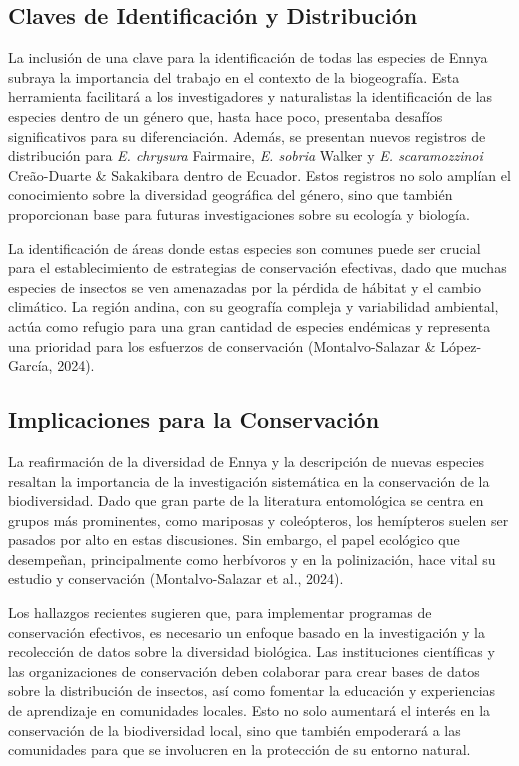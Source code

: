 \documentclass[
  letterpaper,
  DIV=11,
  numbers=noendperiod,
  oneside]{scrreprt}
\begin{document}
\subsection{Claves de Identificación y
Distribución}\label{claves-de-identificaciuxf3n-y-distribuciuxf3n}

La inclusión de una clave para la identificación de todas las especies
de Ennya subraya la importancia del trabajo en el contexto de la
biogeografía. Esta herramienta facilitará a los investigadores y
naturalistas la identificación de las especies dentro de un género que,
hasta hace poco, presentaba desafíos significativos para su
diferenciación. Además, se presentan nuevos registros de distribución
para \emph{E. chrysura} Fairmaire, \emph{E. sobria} Walker y \emph{E.
scaramozzinoi} Creão-Duarte \& Sakakibara dentro de Ecuador. Estos
registros no solo amplían el conocimiento sobre la diversidad geográfica
del género, sino que también proporcionan base para futuras
investigaciones sobre su ecología y biología.

La identificación de áreas donde estas especies son comunes puede ser
crucial para el establecimiento de estrategias de conservación
efectivas, dado que muchas especies de insectos se ven amenazadas por la
pérdida de hábitat y el cambio climático. La región andina, con su
geografía compleja y variabilidad ambiental, actúa como refugio para una
gran cantidad de especies endémicas y representa una prioridad para los
esfuerzos de conservación (Montalvo-Salazar \& López-García, 2024).

\subsection{Implicaciones para la
Conservación}\label{implicaciones-para-la-conservaciuxf3n-1}

La reafirmación de la diversidad de Ennya y la descripción de nuevas
especies resaltan la importancia de la investigación sistemática en la
conservación de la biodiversidad. Dado que gran parte de la literatura
entomológica se centra en grupos más prominentes, como mariposas y
coleópteros, los hemípteros suelen ser pasados por alto en estas
discusiones. Sin embargo, el papel ecológico que desempeñan,
principalmente como herbívoros y en la polinización, hace vital su
estudio y conservación (Montalvo-Salazar et al., 2024).

Los hallazgos recientes sugieren que, para implementar programas de
conservación efectivos, es necesario un enfoque basado en la
investigación y la recolección de datos sobre la diversidad biológica.
Las instituciones científicas y las organizaciones de conservación deben
colaborar para crear bases de datos sobre la distribución de insectos,
así como fomentar la educación y experiencias de aprendizaje en
comunidades locales. Esto no solo aumentará el interés en la
conservación de la biodiversidad local, sino que también empoderará a
las comunidades para que se involucren en la protección de su entorno
natural.
\end{document}
